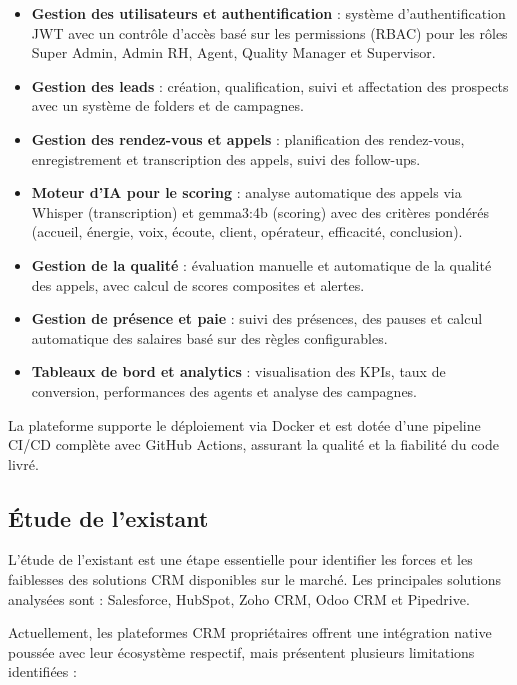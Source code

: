 \begin{itemize}
    \item \textbf{Gestion des utilisateurs et authentification} : système d'authentification
          JWT avec un contrôle d'accès basé sur les permissions (RBAC) pour les rôles
          Super Admin, Admin RH, Agent, Quality Manager et Supervisor.
    \item \textbf{Gestion des leads} : création, qualification, suivi et affectation des
          prospects avec un système de folders et de campagnes.
    \item \textbf{Gestion des rendez-vous et appels} : planification des rendez-vous,
          enregistrement et transcription des appels, suivi des follow-ups.
    \item \textbf{Moteur d'IA pour le scoring} : analyse automatique des appels via Whisper
          (transcription) et gemma3:4b (scoring) avec des critères pondérés (accueil, énergie,
          voix, écoute, client, opérateur, efficacité, conclusion).
    \item \textbf{Gestion de la qualité} : évaluation manuelle et automatique de la qualité
          des appels, avec calcul de scores composites et alertes.
    \item \textbf{Gestion de présence et paie} : suivi des présences, des pauses et calcul
          automatique des salaires basé sur des règles configurables.
    \item \textbf{Tableaux de bord et analytics} : visualisation des KPIs, taux de conversion,
          performances des agents et analyse des campagnes.
\end{itemize}

La plateforme supporte le déploiement via Docker et est dotée d'une pipeline CI/CD complète
avec GitHub Actions, assurant la qualité et la fiabilité du code livré.

\subsection{Étude de l'existant}

L'étude de l'existant est une étape essentielle pour identifier les forces et les faiblesses
des solutions CRM disponibles sur le marché. Les principales solutions analysées sont :
Salesforce, HubSpot, Zoho CRM, Odoo CRM et Pipedrive.

Actuellement, les plateformes CRM propriétaires offrent une intégration native poussée avec
leur écosystème respectif, mais présentent plusieurs limitations identifiées :

